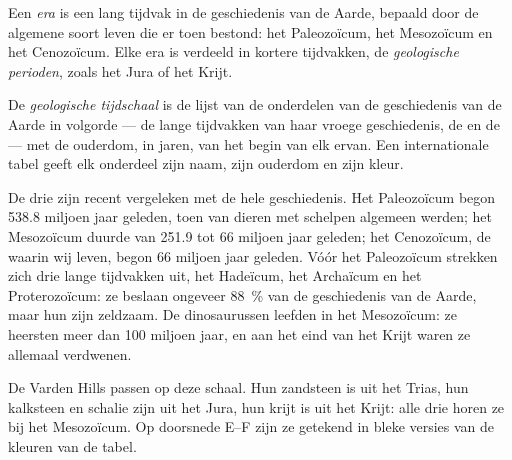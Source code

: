 \begin{definition}\label{def:g7:geological-time:era-period}
Een \emph{era} is een lang tijdvak in de geschiedenis van de
Aarde, bepaald door de algemene soort leven die er toen bestond: het
Paleozoïcum, het Mesozoïcum en het Cenozoïcum. Elke era is verdeeld in
kortere tijdvakken, de \emph{geologische perioden},
zoals het Jura of het Krijt.
\end{definition}

\begin{definition}\label{def:g7:geological-time:time-scale}
De \emph{geologische tijdschaal} is de lijst
van de onderdelen van de geschiedenis van de Aarde in volgorde --- de lange
tijdvakken van haar vroege geschiedenis, de  en de  --- met de ouderdom, in jaren, van het begin van elk ervan. Een
internationale tabel geeft elk onderdeel zijn naam, zijn ouderdom en zijn
kleur.
\end{definition}


De drie  zijn recent vergeleken met de hele geschiedenis. Het
Paleozoïcum begon \num{538.8} miljoen jaar geleden, toen  van
dieren met schelpen algemeen werden; het Mesozoïcum duurde van \num{251.9}
tot \num{66} miljoen jaar geleden; het Cenozoïcum, de  waarin wij leven,
begon \num{66} miljoen jaar geleden. Vóór het Paleozoïcum strekken zich drie
lange tijdvakken uit, het Hadeïcum, het Archaïcum en het Proterozoïcum: ze
beslaan ongeveer 88~\% van de geschiedenis van de Aarde, maar hun 
zijn zeldzaam. De dinosaurussen leefden in het Mesozoïcum: ze heersten meer
dan \num{100} miljoen jaar, en aan het eind van het Krijt waren ze allemaal
verdwenen.

De Varden Hills passen op deze schaal. Hun zandsteen is uit het Trias, hun
kalksteen en schalie zijn uit het Jura, hun krijt is uit het Krijt: alle
drie horen ze bij het Mesozoïcum. Op doorsnede E--F zijn ze getekend in
bleke versies van de kleuren van de tabel.

